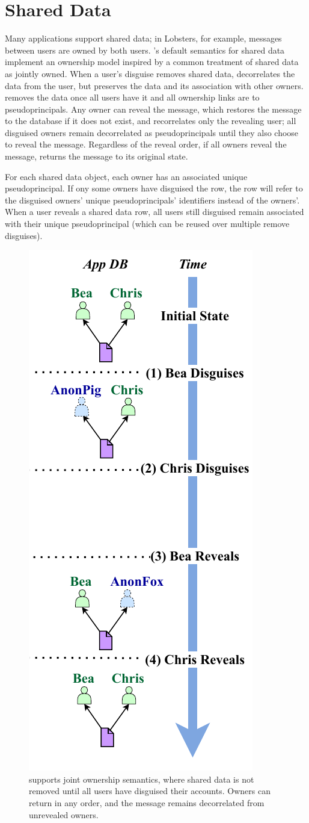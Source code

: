 \section{Shared Data}
Many applications support shared data; in Lobsters, for example, messages
between users are owned by both users.
%
\sys's default semantics for shared data implement an ownership model inspired
by a common treatment of shared data as jointly owned.
%
When a user's disguise removes shared data, \sys decorrelates the data from the
\xxing user, but preserves the data and its association with other owners.
%
\sys removes the data once all users have \xxed it and all ownership links are
to pseudoprincipals.
%
Any owner can reveal the message, which restores the message to the database if
it does not exist, and recorrelates only the revealing user; all disguised
owners remain decorrelated as pseudoprincipals until they also choose to reveal
the message.
%
Regardless of the reveal order, if all owners reveal the message, \sys returns
the message to its original state.
%

%
For each shared data object, each owner has an associated unique
pseudoprincipal. If ony some owners have disguised the row, the row will refer
to the disguised owners' unique pseudoprincipals' identifiers instead of the
owners'.
%
When a user reveals a shared data row, all users still disguised remain
associated with their unique pseudoprincipal (which can be reused over multiple
remove disguises).
%

\begin{figure}
    \centering
    \includegraphics[width=.4\textwidth]{figs/shared_hl}
    \caption[\sys supports joint ownership semantics when disguising shared data.]{\sys supports joint ownership semantics, where shared data is not
    removed until all users have disguised their accounts. Owners can return in
    any order, and the message remains decorrelated from unrevealed owners.}
\label{f:shared:hl}
\end{figure}

